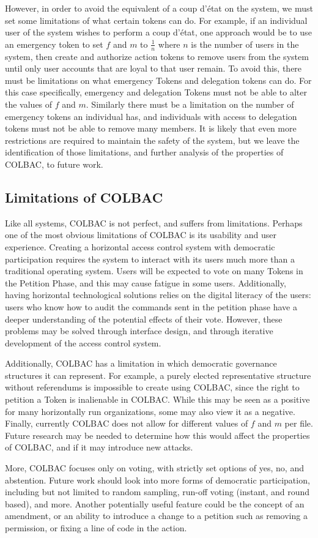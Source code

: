 However, in order to avoid the equivalent of a coup d'\'etat on the system, we
must set some limitations of what certain tokens can do. For example, if an 
individual user of the system wishes to perform a coup d'\'etat, one approach
would be to use an emergency token to set $f$ and $m$ to $\frac{1}{n}$ where $n$
is the number of users in the system, then create and authorize action tokens to
remove users from the system until only user accounts that are loyal to that
user remain. To avoid this, there must be limitations on what emergency Tokens
and delegation tokens can do. For this case specifically, emergency and
delegation Tokens must not be able to alter the values of $f$ and $m$. Similarly
there must be a limitation on the number of emergency tokens an individual has,
and individuals with access to delegation tokens must not be able to remove many
members. It is likely that even more restrictions are required to maintain the
safety of the system, but we leave the identification of those limitations, and
further analysis of the properties of COLBAC, to future work.

\subsection{Limitations of COLBAC}
\label{sec:colbaclimitations}
Like all systems, COLBAC is not perfect, and suffers from limitations. Perhaps
one of the most obvious limitations of COLBAC is its usability and user
experience. Creating a horizontal access control system with democratic
participation requires the system to interact with its users much more than a
traditional operating system. Users will be expected to vote on many Tokens in
the Petition Phase, and this may cause fatigue in some users. Additionally, 
having horizontal technological solutions relies on the digital literacy of the
users: users who know how to audit the commands sent in the petition phase have
a deeper understanding of the potential effects of their vote. However, these
problems may be solved through interface design, and through iterative
development of the access control system.

Additionally, COLBAC has a limitation in which democratic governance structures
it can represent. For example, a purely elected representative structure without
referendums is impossible to create using COLBAC, since the right to petition
a Token is inalienable in COLBAC. While this may be seen as a positive for many
horizontally run organizations, some may also view it as a negative. Finally,
currently COLBAC does not allow for different values of $f$ and $m$ per file.
Future research may be needed to determine how this would affect the properties
of COLBAC, and if it may introduce new attacks.

More, COLBAC focuses only on voting, with strictly set options of yes, no, and
abstention. Future work should look into more forms of democratic participation,
including but not limited to random sampling, run-off voting (instant, and
round based), and more. Another potentially useful feature could be the concept
of an amendment, or an ability to introduce a change to a petition such as
removing a permission, or fixing a line of code in the action.
